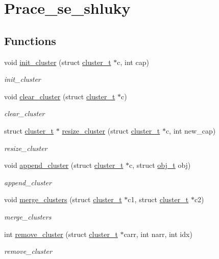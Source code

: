 \hypertarget{group__Prace__se__shluky}{}\section{Prace\+\_\+se\+\_\+shluky}
\label{group__Prace__se__shluky}
\subsection*{Functions}
\begin{DoxyCompactItemize}
\item 
void \hyperlink{group__Prace__se__shluky_ga96db0862471d90abb3d80103ef3695f7}{init\+\_\+cluster} (struct \hyperlink{structcluster__t}{cluster\+\_\+t} $\ast$c, int cap)
\begin{DoxyCompactList}\small\item\em init\+\_\+cluster \end{DoxyCompactList}\item 
void \hyperlink{group__Prace__se__shluky_ga8289f092f205baeb13cf33cfffa15324}{clear\+\_\+cluster} (struct \hyperlink{structcluster__t}{cluster\+\_\+t} $\ast$c)
\begin{DoxyCompactList}\small\item\em clear\+\_\+cluster \end{DoxyCompactList}\item 
struct \hyperlink{structcluster__t}{cluster\+\_\+t} $\ast$ \hyperlink{group__Prace__se__shluky_ga0d8702f8bee3bccb81380e012a615a3d}{resize\+\_\+cluster} (struct \hyperlink{structcluster__t}{cluster\+\_\+t} $\ast$c, int new\+\_\+cap)
\begin{DoxyCompactList}\small\item\em resize\+\_\+cluster \end{DoxyCompactList}\item 
void \hyperlink{group__Prace__se__shluky_gab6269b64b2c7f4842a51c58b2d86a2e5}{append\+\_\+cluster} (struct \hyperlink{structcluster__t}{cluster\+\_\+t} $\ast$c, struct \hyperlink{structobj__t}{obj\+\_\+t} obj)
\begin{DoxyCompactList}\small\item\em append\+\_\+cluster \end{DoxyCompactList}\item 
void \hyperlink{group__Prace__se__shluky_gac39a25fdec1f4952ec92ee5407893158}{merge\+\_\+clusters} (struct \hyperlink{structcluster__t}{cluster\+\_\+t} $\ast$c1, struct \hyperlink{structcluster__t}{cluster\+\_\+t} $\ast$c2)
\begin{DoxyCompactList}\small\item\em merge\+\_\+clusters \end{DoxyCompactList}\item 
int \hyperlink{group__Prace__se__shluky_gaf73744f9128e4605127b40932a730a48}{remove\+\_\+cluster} (struct \hyperlink{structcluster__t}{cluster\+\_\+t} $\ast$carr, int narr, int idx)
\begin{DoxyCompactList}\small\item\em remove\+\_\+cluster \end{DoxyCompactList}\end{DoxyCompactItemize}

